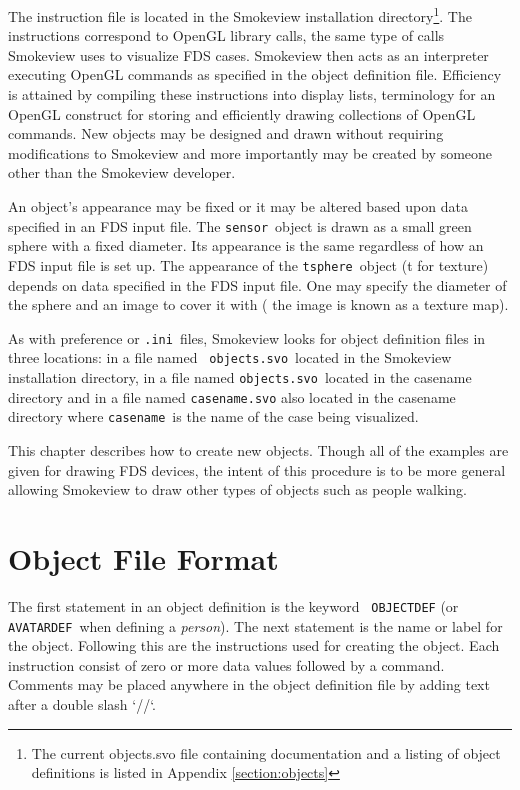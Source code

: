\documentclass[11pt,twoside]{book}
\begin{document}
The instruction file is located in the  Smokeview installation
directory\footnote{The current objects.svo file containing
documentation and a listing of object definitions is listed in
Appendix \ref{section:objects}}. The instructions correspond to
OpenGL library calls, the same type of calls Smokeview uses to
visualize FDS cases. Smokeview then acts as an interpreter
executing OpenGL commands as specified in the object definition
file. Efficiency is attained by compiling these instructions into
display lists, terminology for an OpenGL construct for storing and
efficiently drawing collections of OpenGL commands.  New objects
may be designed and drawn without requiring modifications to
Smokeview and more importantly may be created by someone other
than the Smokeview developer.

An object's appearance may be fixed or it may be altered based
upon data specified in an FDS input file.  The {\tt sensor}\
object is drawn as a small green sphere with a fixed diameter.
Its appearance is the same regardless of how an FDS input file is
set up. The appearance of the {\tt tsphere}\ object (t for
texture) depends on data specified in the FDS input file.  One may
specify the diameter of the sphere and an image to cover it with (
the image is known as a texture map).

As with preference or {\tt .ini}\ files, Smokeview looks for
object definition files in three locations: in a file named {\tt
objects.svo}\ located in the Smokeview installation directory, in
a file named {\tt objects.svo}\ located in the casename directory
and in a file named {\tt casename.svo} also located in the
casename directory where {\tt casename}\ is the name of the case
being visualized.

This chapter describes how to create new objects. Though all of
the examples are given for drawing FDS devices, the intent of this
procedure is to be more general allowing Smokeview to draw other
types of objects such as people walking.

\section{Object File Format}
The first statement in an object definition is the keyword {\tt
OBJECTDEF} (or {\tt AVATARDEF}\ when defining a {\em person}). The
next statement is the name or label for the object. Following this
are the instructions used for creating the object. Each
instruction consist of zero or more data values followed by a
command. Comments may be placed anywhere in the object definition
file by adding text after a double slash `//`.
\end{document}
